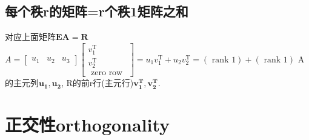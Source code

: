 \documentclass[UTF8]{article}
\begin{document}
    \subsection{每个秩r的矩阵=r个秩1矩阵之和}
    对应上面矩阵$\boldsymbol{E} \boldsymbol{A}=\boldsymbol{R}$\\
    $A=\left[\begin{array}{lll}{u_{1}} & {u_{2}} & {u_{3}}\end{array}\right]\left[\begin{array}{c}{v_{1}^{\mathrm{T}}} \\ {v_{2}^{\mathrm{T}}} \\ {\text { zero row }}\end{array}\right]=u_{1} v_{1}^{\mathrm{T}}+u_{2} v_{2}^{\mathrm{T}}=(\text { rank } 1)+(\text { rank } 1)$
    A的主元列$\bm{u_1,u_2}$, R的前r行(主元行)$\bm{v_{1}^{T}, v_{2}^{T}}$.\\

    \section{正交性orthogonality}
\end{document}
